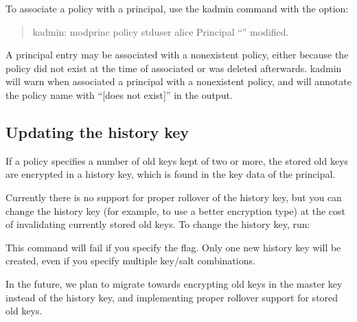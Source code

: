 \documentclass[letterpaper,10pt,english]{sphinxmanual}
\begin{document}
\sphinxAtStartPar
To associate a policy with a principal, use the kadmin
 command with the  option:
\begin{quote}

\sphinxAtStartPar
kadmin: modprinc \sphinxhyphen{}policy stduser alice
Principal “” modified.
\end{quote}

\sphinxAtStartPar
A principal entry may be associated with a nonexistent policy, either
because the policy did not exist at the time of associated or was
deleted afterwards.  kadmin will warn when associated a principal with
a nonexistent policy, and will annotate the policy name with “{[}does
not exist{]}” in the  output.


\subsection{Updating the history key}
\label{\detokenize{admin/database:updating-the-history-key}}\label{\detokenize{admin/database:updating-history-key}}
\sphinxAtStartPar
If a policy specifies a number of old keys kept of two or more, the
stored old keys are encrypted in a history key, which is found in the
key data of the  principal.

\sphinxAtStartPar
Currently there is no support for proper rollover of the history key,
but you can change the history key (for example, to use a better
encryption type) at the cost of invalidating currently stored old
keys.  To change the history key, run:

\begin{sphinxVerbatim}[commandchars=\\\{\}]
   
\end{sphinxVerbatim}

\sphinxAtStartPar
This command will fail if you specify the  flag.  Only one
new history key will be created, even if you specify multiple key/salt
combinations.

\sphinxAtStartPar
In the future, we plan to migrate towards encrypting old keys in the
master key instead of the history key, and implementing proper
rollover support for stored old keys.
\end{document}

